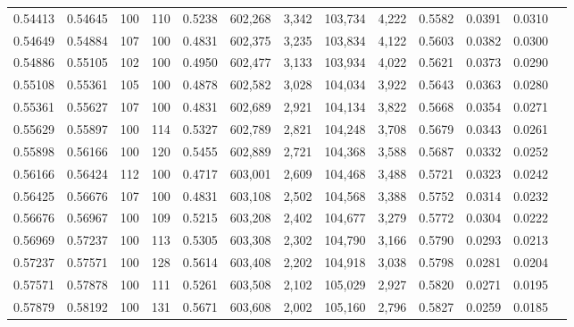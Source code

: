 \begin{tabular}{rrrrrrrrrrrrr}
0.54413 & 0.54645 &   100 & 110 &                                     0.5238 & 602,268 &   3,342 & 103,734 &   4,222 & 0.5582 & 0.0391 & 0.0310 \\
0.54649 & 0.54884 &   107 & 100 &                                     0.4831 & 602,375 &   3,235 & 103,834 &   4,122 & 0.5603 & 0.0382 & 0.0300 \\
0.54886 & 0.55105 &   102 & 100 &                                     0.4950 & 602,477 &   3,133 & 103,934 &   4,022 & 0.5621 & 0.0373 & 0.0290 \\
0.55108 & 0.55361 &   105 & 100 &                                     0.4878 & 602,582 &   3,028 & 104,034 &   3,922 & 0.5643 & 0.0363 & 0.0280 \\
0.55361 & 0.55627 &   107 & 100 &                                     0.4831 & 602,689 &   2,921 & 104,134 &   3,822 & 0.5668 & 0.0354 & 0.0271 \\
0.55629 & 0.55897 &   100 & 114 &                                     0.5327 & 602,789 &   2,821 & 104,248 &   3,708 & 0.5679 & 0.0343 & 0.0261 \\
0.55898 & 0.56166 &   100 & 120 &                                     0.5455 & 602,889 &   2,721 & 104,368 &   3,588 & 0.5687 & 0.0332 & 0.0252 \\
0.56166 & 0.56424 &   112 & 100 &                                     0.4717 & 603,001 &   2,609 & 104,468 &   3,488 & 0.5721 & 0.0323 & 0.0242 \\
0.56425 & 0.56676 &   107 & 100 &                                     0.4831 & 603,108 &   2,502 & 104,568 &   3,388 & 0.5752 & 0.0314 & 0.0232 \\
0.56676 & 0.56967 &   100 & 109 &                                     0.5215 & 603,208 &   2,402 & 104,677 &   3,279 & 0.5772 & 0.0304 & 0.0222 \\
0.56969 & 0.57237 &   100 & 113 &                                     0.5305 & 603,308 &   2,302 & 104,790 &   3,166 & 0.5790 & 0.0293 & 0.0213 \\
0.57237 & 0.57571 &   100 & 128 &                                     0.5614 & 603,408 &   2,202 & 104,918 &   3,038 & 0.5798 & 0.0281 & 0.0204 \\
0.57571 & 0.57878 &   100 & 111 &                                     0.5261 & 603,508 &   2,102 & 105,029 &   2,927 & 0.5820 & 0.0271 & 0.0195 \\
0.57879 & 0.58192 &   100 & 131 &                                     0.5671 & 603,608 &   2,002 & 105,160 &   2,796 & 0.5827 & 0.0259 & 0.0185 \\

\end{tabular}
